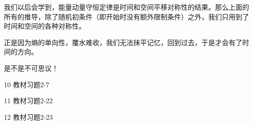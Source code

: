 \documentclass[CJK]{beamer}
\begin{document}
\begin{frame}
\bch
我们以后会学到，能量动量守恒定律是时间和空间平移对称性的结果。那么上面的所有的推导，除了随机初条件（即开始时没有额外限制条件）之外，我们只用到了时间和空间的各种对称性。

\skipline
正是因为熵的单向性，覆水难收，我们无法抹平记忆，回到过去，于是才会有了时间的方向。


是不是不可思议！

\ech
\end{frame}



\begin{frame}
\bch
\bitem
\item[10]{教材习题2-7}
\item[11]{教材习题2-22}
\item[12]{教材习题2-23}
\eitem
\ech
\end{frame}
\end{document}
